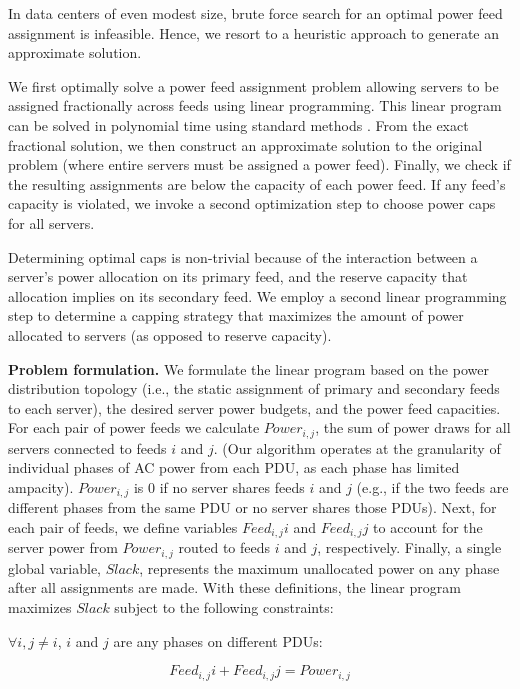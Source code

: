 In data centers of even modest size, brute force search for an optimal power feed assignment is infeasible.  Hence, we resort to a heuristic approach to generate an approximate solution.  

We first optimally solve a power feed assignment problem allowing servers to be assigned fractionally across feeds using linear programming.  This linear program can be solved in polynomial time using standard methods \cite{CormenBook}. From the exact fractional solution, we then construct an approximate solution to the original problem (where entire servers must be assigned a power feed).  Finally, we check if the resulting assignments are below the capacity of each power feed.  If any feed's capacity is violated, we invoke a second optimization step to choose power caps for all servers.  

Determining optimal caps is non-trivial because of the interaction between a server's power allocation on its primary feed, and the reserve capacity that allocation implies on its secondary feed.  We employ a second linear programming step to determine a capping strategy that maximizes the amount of power allocated to servers (as opposed to reserve capacity).

{\bf Problem formulation.} We formulate the linear program based on the power distribution topology (i.e., the static assignment of primary and secondary feeds to each server), the desired server power budgets, and the power feed capacities.  For each pair of power feeds we calculate $Power_{i,j}$, the sum of power draws for all servers connected to feeds $i$ and $j$. (Our algorithm operates at the granularity of individual phases of AC power from each PDU, as each phase has limited ampacity). $Power_{i,j}$ is 0 if no server shares feeds  $i$ and $j$ (e.g., if the two feeds are different phases from the same PDU or no server shares those PDUs).  Next, for each pair of feeds, we define variables $Feed_{i,j}i$ and $Feed_{i,j}j$ to account for the server power from $Power_{i,j}$ routed to feeds $i$ and $j$, respectively.  Finally, a single global variable, $Slack$, represents the maximum unallocated power on any phase after all assignments are made.  
With these definitions, the linear program maximizes $Slack$ subject to the following constraints:

$\forall i, j \neq i$, $i$ and $j$ are any phases on different PDUs:

\vspace{-.2 in}
\begin{equation}\label{rationalbin}
Feed_{i,j}i + Feed_{i,j}j = Power_{i,j}
\end{equation}

